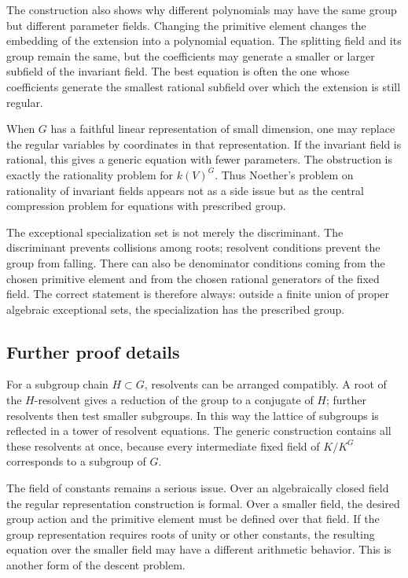 \documentclass[12pt]{article}
\begin{document}
The construction also shows why different polynomials may have the same group but different
parameter fields. Changing the primitive element changes the embedding of the extension into a
polynomial equation. The splitting field and its group remain the same, but the coefficients may
generate a smaller or larger subfield of the invariant field. The best equation is often the one
whose coefficients generate the smallest rational subfield over which the extension is still
regular.

When \(G\) has a faithful linear representation of small dimension, one may replace the regular
variables by coordinates in that representation. If the invariant field is rational, this gives a
generic equation with fewer parameters. The obstruction is exactly the rationality problem for
\(k(V)^G\). Thus Noether's problem on rationality of invariant fields appears not as a side issue
but as the central compression problem for equations with prescribed group.

The exceptional specialization set is not merely the discriminant. The discriminant prevents
collisions among roots; resolvent conditions prevent the group from falling. There can also be
denominator conditions coming from the chosen primitive element and from the chosen rational
generators of the fixed field. The correct statement is therefore always: outside a finite union of
proper algebraic exceptional sets, the specialization has the prescribed group.


\subsection{Further proof details}

For a subgroup chain \(H\subset G\), resolvents can be arranged compatibly. A root of the
\(H\)-resolvent gives a reduction of the group to a conjugate of \(H\); further resolvents then test
smaller subgroups. In this way the lattice of subgroups is reflected in a tower of resolvent
equations. The generic construction contains all these resolvents at once, because every
intermediate fixed field of \(K/K^G\) corresponds to a subgroup of \(G\).

The field of constants remains a serious issue. Over an algebraically closed field the regular
representation construction is formal. Over a smaller field, the desired group action and the
primitive element must be defined over that field. If the group representation requires roots of
unity or other constants, the resulting equation over the smaller field may have a different
arithmetic behavior. This is another form of the descent problem.
\end{document}
